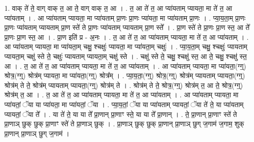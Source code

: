 \documentclass[17pt]{extarticle}
\begin{document}
1. वाक् ते॑ ते॒ वाग् वाक् त॒ आ ते॒ वाग् वाक् त॒ आ । . त॒ आ ते॑ त॒ आ प्या॑यताम् प्यायता॒ मा ते॑ त॒ आ प्या॑यताम् । . आ प्या॑यताम् प्यायता॒ मा प्या॑यताम् प्रा॒णः प्रा॒णः प्या॑यता॒ मा प्या॑यताम् प्रा॒णः । . प्या॒य॒ता॒म् प्रा॒णः प्रा॒णः प्या॑यताम् प्यायताम् प्रा॒ण स्ते॑ ते प्रा॒णः प्या॑यताम् प्यायताम् प्रा॒ण स्ते᳚ । . प्रा॒ण स्ते॑ ते प्रा॒णः प्रा॒ण स्त॒ आ ते᳚ प्रा॒णः प्रा॒ण स्त॒ आ । . प्रा॒ण इति॑ प्र - अ॒नः । . त॒ आ ते॑ त॒ आ प्या॑यताम् प्यायता॒ मा ते॑ त॒ आ प्या॑यताम् । . आ प्या॑यताम् प्यायता॒ मा प्या॑यता॒म् चक्षु॒ श्चक्षुः॑ प्यायता॒ मा प्या॑यता॒म् चक्षुः॑ । . प्या॒य॒ता॒म् चक्षु॒ श्चक्षुः॑ प्यायताम् प्यायता॒म् चक्षु॑ स्ते ते॒ चक्षुः॑ प्यायताम् प्यायता॒म् चक्षु॑ स्ते । . चक्षु॑ स्ते ते॒ चक्षु॒ श्चक्षु॑ स्त॒ आ ते॒ चक्षु॒ श्चक्षु॑ स्त॒ आ । . त॒ आ ते॑ त॒ आ प्या॑यताम् प्यायता॒ मा ते॑ त॒ आ प्या॑यताम् । . आ प्या॑यताम् प्यायता॒ मा प्या॑यता॒(ग्ग्॒) श्रोत्र॒(ग्ग्॒) श्रोत्र॑म् प्यायता॒ मा प्या॑यता॒(ग्ग्॒) श्रोत्र᳚म् । . प्या॒य॒ता॒(ग्ग्॒) श्रोत्र॒(ग्ग्॒) श्रोत्र॑म् प्यायताम् प्यायता॒(ग्ग्॒) श्रोत्र॑म् ते ते॒ श्रोत्र॑म् प्यायताम् प्यायता॒(ग्ग्॒) श्रोत्र॑म् ते । . श्रोत्र॑म् ते ते॒ श्रोत्र॒(ग्ग्॒) श्रोत्र॑म् त॒ आ ते॒ श्रोत्र॒(ग्ग्॒) श्रोत्र॑म् त॒ आ । . त॒ आ ते॑ त॒ आ प्या॑यताम् प्यायता॒ मा ते॑ त॒ आ प्या॑यताम् । . आ प्या॑यताम् प्यायता॒ मा प्या॑यतां॒ ॅया या प्या॑यता॒ मा प्या॑यतां॒ ॅया । . प्या॒य॒तां॒ ॅया या प्या॑यताम् प्यायतां॒ ॅया ते॑ ते॒ या प्या॑यताम् प्यायतां॒ ॅया ते᳚ । . या ते॑ ते॒ या या ते᳚ प्रा॒णान् प्रा॒णाꣳ स्ते॒ या या ते᳚ प्रा॒णान् । . ते॒ प्रा॒णान् प्रा॒णाꣳ स्ते॑ ते प्रा॒णाञ् छुक् छुक् प्रा॒णाꣳ स्ते॑ ते प्रा॒णाञ् छुक् । . प्रा॒णाञ् छुक् छुक् प्रा॒णान् प्रा॒णाञ् छुग् ज॒गाम॑ ज॒गाम॒ शुक् प्रा॒णान् प्रा॒णाञ् छुग् ज॒गाम॑ । \newline
\end{document}
